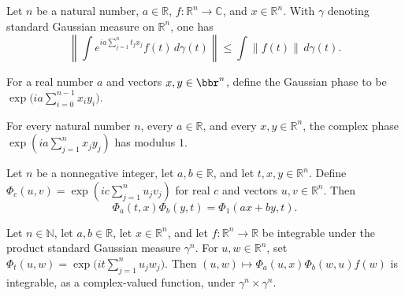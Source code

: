\begin{lemma}
\label{BooleanAnalysis.GaussianSpace.norm_gaussianFourierIntegral_le}
\leanok
{}
Let $n$ be a natural number, $a\in\mathbb R$, $f:\mathbb R^n\to\mathbb C$, and
$x\in\mathbb R^n$. With $\gamma$ denoting standard Gaussian measure on $\mathbb R^n$,
one has
\[
\left\|\int e^{i a\sum_{j=1}^n t_jx_j}f(t)\,d\gamma(t)\right\|
\leq \int\|f(t)\|\,d\gamma(t).
\]
\end{lemma}

\begin{definition}
\label{BooleanAnalysis.GaussianSpace.gaussianPhase}
\leanok
For a real number $a$ and vectors $x,y\in\bbr^n$, define the Gaussian phase to be
$\exp\bigl(i a\sum_{i=0}^{n-1}x_i y_i\bigr)$.
\end{definition}

\begin{lemma}
\label{BooleanAnalysis.GaussianSpace.norm_gaussianPhase}
\leanok
{}
For every natural number $n$, every $a\in\mathbb R$, and every $x,y\in\mathbb R^n$, the
complex phase $\exp\!\left(i a\sum_{j=1}^n x_jy_j\right)$ has modulus $1$.
\end{lemma}

\begin{lemma}
\label{BooleanAnalysis.GaussianSpace.gaussianPhase_mul}
\leanok
{}
Let $n$ be a nonnegative integer, let $a,b\in\mathbb R$, and let $t,x,y\in\mathbb R^n$.
Define $\Phi_c(u,v)=\exp\left(i c\sum_{j=1}^n u_jv_j\right)$ for real $c$ and vectors
$u,v\in\mathbb R^n$. Then
\[\Phi_a(t,x)\Phi_b(y,t)=\Phi_1(ax+by,t).\]
\end{lemma}

\begin{lemma}
\label{BooleanAnalysis.GaussianSpace.integrable_gaussian_double_phase}
\leanok
{}
Let $n\in\mathbb N$, let $a,b\in\mathbb R$, let $x\in\mathbb R^n$, and let $f:\mathbb
R^n\to\mathbb R$ be integrable under the product standard Gaussian measure $\gamma^n$.
For $u,w\in\mathbb R^n$, set $\Phi_t(u,w)=\exp\bigl(i t\sum_{j=1}^n u_jw_j\bigr)$. Then
$(u,w)\mapsto\Phi_a(u,x)\Phi_b(w,u)f(w)$ is integrable, as a complex-valued function,
under $\gamma^n\times\gamma^n$.
\end{lemma}

